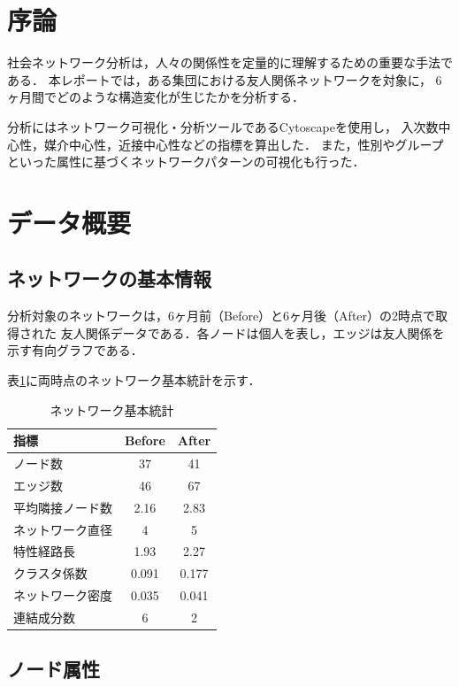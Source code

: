 \section{序論}

社会ネットワーク分析は，人々の関係性を定量的に理解するための重要な手法である．
本レポートでは，ある集団における友人関係ネットワークを対象に，
6ヶ月間でどのような構造変化が生じたかを分析する．

分析にはネットワーク可視化・分析ツールであるCytoscapeを使用し，
入次数中心性，媒介中心性，近接中心性などの指標を算出した．
また，性別やグループといった属性に基づくネットワークパターンの可視化も行った．

\section{データ概要}

\subsection{ネットワークの基本情報}

分析対象のネットワークは，6ヶ月前（Before）と6ヶ月後（After）の2時点で取得された
友人関係データである．各ノードは個人を表し，エッジは友人関係を示す有向グラフである．

表\ref{tab:network_overview}に両時点のネットワーク基本統計を示す．

\begin{table}[htbp]
\centering
\caption{ネットワーク基本統計}
\label{tab:network_overview}
\begin{tabular}{lcc}
\toprule
指標 & Before & After \\
\midrule
ノード数 & 37 & 41 \\
エッジ数 & 46 & 67 \\
平均隣接ノード数 & 2.16 & 2.83 \\
ネットワーク直径 & 4 & 5 \\
特性経路長 & 1.93 & 2.27 \\
クラスタ係数 & 0.091 & 0.177 \\
ネットワーク密度 & 0.035 & 0.041 \\
連結成分数 & 6 & 2 \\
\bottomrule
\end{tabular}
\end{table}

\subsection{ノード属性}

